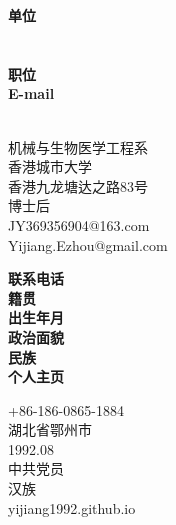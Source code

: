 \documentclass[11pt]{moderncv}
\begin{document}
\begin{CJK*}{UTF8}{gbsn}

 \cnname{\hspace{0.2em}\color{blue}{姜 艺}}
 \maketitle
\vspace{-12mm}

\parbox[t]{2.5cm}{
                \textbf{单位}\\
                \textbf{}\\
                \textbf{}\\
                \textbf{职位}\\
                \textbf{E-mail}\\
                \textbf{}\\
                }
\parbox[t]{6cm}{机械与生物医学工程系\\
                香港城市大学\\
                香港九龙塘达之路83号\\
                博士后\\
                JY369356904@163.com\\
                Yijiang.Ezhou@gmail.com\\
                }
\hspace{.3cm}
\parbox[t]{2.5cm}{
               \textbf{联系电话}\\
               \textbf{籍贯}\\
               \textbf{出生年月}\\
               \textbf{政治面貌}\\
               \textbf{民族}\\
               \textbf{个人主页}\\
               }
\parbox[t]{5cm}{
               +86-186-0865-1884\\
               湖北省鄂州市\\
               1992.08\\
               中共党员\\
               汉族\\
               yijiang1992.github.io\\
               }
\vspace{3mm}

\end{CJK*}
\end{document}
